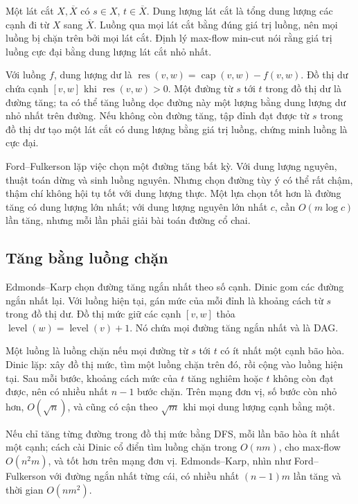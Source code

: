 \documentclass[11pt]{article}
\begin{document}
Một lát cắt \(X,\overline X\) có \(s\in X\), \(t\in\overline X\). Dung lượng
lát cắt là tổng dung lượng các cạnh đi từ \(X\) sang \(\overline X\). Luồng qua
mọi lát cắt bằng đúng giá trị luồng, nên mọi luồng bị chặn trên bởi mọi lát cắt.
Định lý max-flow min-cut nói rằng giá trị luồng cực đại bằng dung lượng lát cắt
nhỏ nhất.

Với luồng \(f\), dung lượng dư là
\(\operatorname{res}(v,w)=\operatorname{cap}(v,w)-f(v,w)\). Đồ thị dư chứa cạnh
\([v,w]\) khi \(\operatorname{res}(v,w)>0\). Một đường từ \(s\) tới \(t\) trong
đồ thị dư là đường tăng; ta có thể tăng luồng dọc đường này một lượng bằng dung
lượng dư nhỏ nhất trên đường. Nếu không còn đường tăng, tập đỉnh đạt được từ
\(s\) trong đồ thị dư tạo một lát cắt có dung lượng bằng giá trị luồng, chứng
minh luồng là cực đại.

Ford--Fulkerson lặp việc chọn một đường tăng bất kỳ. Với dung lượng nguyên,
thuật toán dừng và sinh luồng nguyên. Nhưng chọn đường tùy ý có thể rất chậm,
thậm chí không hội tụ tốt với dung lượng thực. Một lựa chọn tốt hơn là đường
tăng có dung lượng lớn nhất; với dung lượng nguyên lớn nhất \(c\), cần
\(O(m\log c)\) lần tăng, nhưng mỗi lần phải giải bài toán đường cổ chai.

\subsection*{Tăng bằng luồng chặn}

Edmonds--Karp chọn đường tăng ngắn nhất theo số cạnh. Dinic gom các đường ngắn
nhất lại. Với luồng hiện tại, gán mức của mỗi đỉnh là khoảng cách từ \(s\) trong
đồ thị dư. Đồ thị mức giữ các cạnh \([v,w]\) thỏa
\(\operatorname{level}(w)=\operatorname{level}(v)+1\). Nó chứa mọi đường tăng
ngắn nhất và là DAG.

Một luồng là luồng chặn nếu mọi đường từ \(s\) tới \(t\) có ít nhất một cạnh bão
hòa. Dinic lặp: xây đồ thị mức, tìm một luồng chặn trên đó, rồi cộng vào luồng
hiện tại. Sau mỗi bước, khoảng cách mức của \(t\) tăng nghiêm hoặc \(t\) không
còn đạt được, nên có nhiều nhất \(n-1\) bước chặn. Trên mạng đơn vị, số bước còn
nhỏ hơn, \(O(\sqrt n)\), và cũng có cận theo \(\sqrt m\) khi mọi dung lượng cạnh
bằng một.

Nếu chỉ tăng từng đường trong đồ thị mức bằng DFS, mỗi lần bão hòa ít nhất một
cạnh; cách cài Dinic cổ điển tìm luồng chặn trong \(O(nm)\), cho max-flow
\(O(n^2m)\), và tốt hơn trên mạng đơn vị. Edmonds--Karp, nhìn như Ford--Fulkerson
với đường ngắn nhất từng cái, có nhiều nhất \((n-1)m\) lần tăng và thời gian
\(O(nm^2)\).
\end{document}
